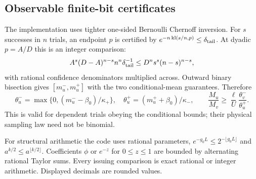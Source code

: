 \subsection{Observable finite-bit certificates}
The implementation uses tighter one-sided Bernoulli Chernoff inversion. For $s$ successes in $n$ trials, an endpoint $p$ is certified by $e^{-n\operatorname{kl}(s/n,p)}\le\delta_{\rm tail}$. At dyadic $p=A/D$ this is an integer comparison:
\[
 A^s(D-A)^{n-s}n^n\delta_{\rm tail}^{-1}
 \le D^n s^s(n-s)^{n-s},
\]
with rational confidence denominators multiplied across. Outward binary bisection gives $[m_u^-,m_u^+]$ with the two conditional-mean guarantees. Therefore
\begin{equation}
 \theta_u^- =\max\{0,(m_u^- -\beta_0)/\kappa_+\},\quad
 \theta_u^+ =(m_u^+ +\beta_0)/\kappa_-,\qquad
 \frac{M_u}{M_v}\ge\frac\ell U\frac{\theta_v^-}{\theta_u^+}.
 \label{eq:observedboundary}
\end{equation}
This is valid for dependent trials obeying the conditional bounds; their physical sampling law need not be binomial.

For structural arithmetic the code uses rational parameters, $e^{-g_0L}\le2^{-\lfloor g_0L\rfloor}$ and $a^{k/2}\le a^{\lfloor k/2\rfloor}$. Coefficients $\phi$ or $e^{-z}$ for $0\le z\le1$ are bounded by alternating rational Taylor sums. Every issuing comparison is exact rational or integer arithmetic. Displayed decimals are rounded values.
